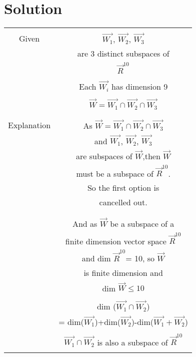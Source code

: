 \documentclass[journal,12pt,twocolumn]{IEEEtran}
\begin{document}
\section{Solution} 
\begin{table}[h!]
\begin{center}
\begin{tabular}{|c|c|}
\hline
& \\
Given & $\vec{W_1}$, $\vec{W_2}$, $\vec{W_3}$\\
& are 3 distinct subspaces of \\
& $\vec{R}^{10}$\\
& \\
& Each $\vec{W_i}$ has dimension 9\\
& \\
& $\vec{W} = \vec{W_1} \cap \vec{W_2} \cap \vec{W_3}$\\
& \\
\hline
& \\
Explanation & As $\vec{W} = \vec{W_1} \cap \vec{W_2}\cap \vec{W_3}$\\
& and $\vec{W_1}$, $\vec{W_2}$, $\vec{W_3}$ \\
& are subspaces of $\vec{W}$,then $\vec{W}$\\
& must be a subspace of $\vec{R}^{10}$.\\
& So the first option is \\
& cancelled out.\\
& \\
\hline
& \\
& And as $\vec{W}$ be a subspace of a \\
& finite dimension vector space $\vec{R}^{10}$ \\
& and dim $\vec{R}^{10}$= 10, so $\vec{W}$ \\
& is finite dimension and \\
& dim $\vec{W} \leq 10$ \\
& \\
\hline
& dim ($\vec{W_1} \cap \vec{W_2}$)\\
& = dim($\vec{W_1}$)+dim($\vec{W_2}$)-dim($\vec{W_1}+\vec{W_2}$)\\
& \\
& $\vec{W_1} \cap \vec{W_2}$ is also a subspace of $\vec{R}^{10}$\\
& \\
\hline
\end{tabular}
\end{center}
\end{table}
\end{document}
